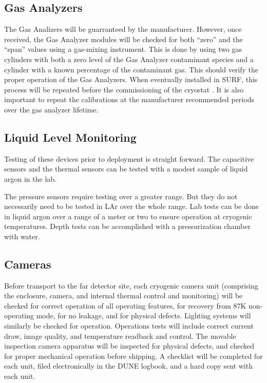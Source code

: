 \subsection{Gas Analyzers}
\label{sec:fdgen-slow-cryo-qc-ga}

The Gas Analizers will be guarranteed by the manufacturer. However, once received, the Gas Analyzer modules will be checked for both ``zero'' and the ``span'' values using a gas-mixing instrument. This is done by using two gas cylinders with both a zero level of the Gas Analyzer contaminant species and a cylinder with a known percentage of the contaminant gas. This should verify the proper operation of the Gas Analyzers. When eventually installed in SURF, this process will be repeated before the commissioning of the cryostat . It is also important to repeat the calibrations at the manufacturer recommended periods over the gas analyzer lifetime.
 

\subsection{Liquid Level Monitoring}
\label{sec:fdgen-slow-cryo-qc-llm}

Testing of these devices prior to deployment is straight forward.  The
capacitive sensors and the thermal sensors can be tested with a modest sample
of liquid argon in the lab.

The pressure sensors require testing over a greater range.  But they do not
necessarily need to be tested in LAr over the whole range.  Lab tests
can be done in liquid argon over a range of a meter or two to ensure operation
at cryogenic temperatures.  Depth tests can be accomplished with a
pressurization chamber with water.


\subsection{Cameras}
\label{sec:fdgen-slow-cryo-qc-c}

Before transport to the far detector site, each cryogenic camera unit (comprising the enclosure, camera, and internal thermal control and monitoring) will be checked for correct operation of all operating features, for recovery from 87K non-operating mode, for no leakage, and for physical defects. Lighting systems will similarly be checked for operation. Operations tests will include correct current draw, image quality, and temperature readback and control. The movable inspection camera apparatus will be inspected for physical defects, and checked for proper mechanical operation before shipping. A checklist will be completed for each unit, filed electronically in the DUNE logbook, and a hard copy sent with each unit. 

